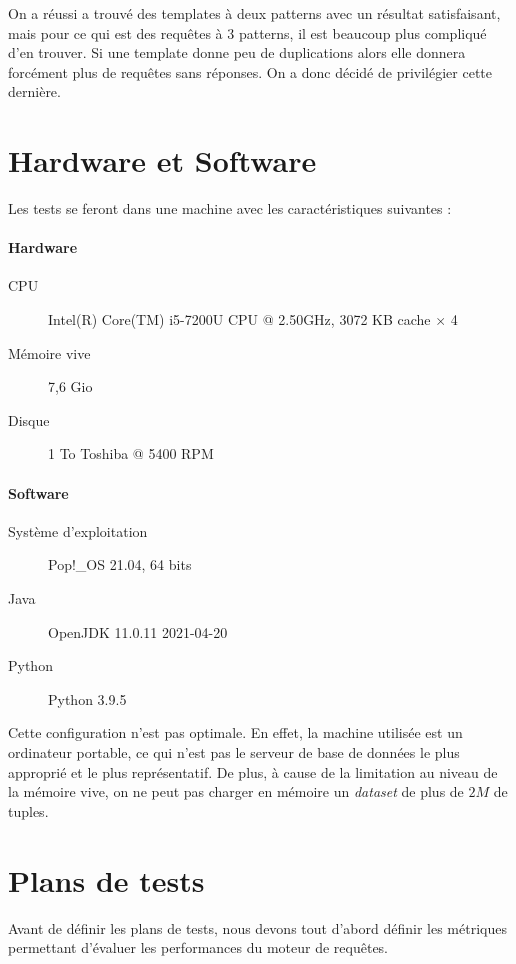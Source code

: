 \documentclass[12pt,titlepage]{article}
\begin{document}
On a réussi a trouvé des templates à deux patterns avec un résultat satisfaisant, mais pour ce qui est des requêtes à 3 patterns, il est beaucoup plus compliqué d'en trouver. Si une template donne peu de duplications alors elle donnera forcément plus de requêtes sans réponses. On a donc décidé de privilégier cette dernière.

\section{Hardware et Software}

Les tests se feront dans une machine avec les caractéristiques suivantes :

\paragraph{Hardware}

\begin{description}
\item[CPU] Intel(R) Core(TM) i5-7200U CPU @ 2.50GHz, 3072 KB cache $\times$ 4
\item[Mémoire vive] 7,6 Gio
\item[Disque] 1 To Toshiba @ 5400 RPM
\end{description}

\paragraph{Software}

\begin{description}
\item[Système d'exploitation] Pop!\_OS 21.04, 64 bits
\item[Java] OpenJDK 11.0.11 2021-04-20
\item[Python] Python 3.9.5
\end{description}

Cette configuration n'est pas optimale. En effet, la machine utilisée est un ordinateur portable, ce qui n'est pas le serveur de base de données le plus approprié et le plus représentatif. De plus, à cause de la limitation au niveau de la mémoire vive, on ne peut pas charger en mémoire un \textit{dataset} de plus de $2M$ de tuples.

\section{Plans de tests}

Avant de définir les plans de tests, nous devons tout d'abord définir les métriques permettant d’évaluer les performances du moteur de requêtes.
\end{document}
